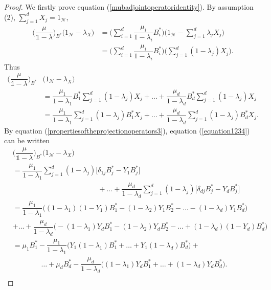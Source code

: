 \documentclass[11pt, reqno]{amsart}
\newcommand\1{\boldsymbol {1}}
\numberwithin{equation}{section}
\begin{document}
\begin{proof}
We firstly prove equation (\ref{mubadjointoperatoridentity}). By assumption  (2), $\sum_{j=1}^{d} X_{j} = 1_{\mathcal{N}}$,
\begin{align*}
\bigg(\dfrac{\mu}{\mathds{1}-\lambda}\bigg)_{B^{*}}\big(1_{\mathcal{N}}-\lambda_{X}\big) &= \bigg(\sum_{i=1}^{d} \dfrac{\mu_{i}}{1-\lambda_{i}} B_{i}^{*} \bigg)\bigg(1_{\mathcal{N}}-\sum_{j=1}^{d}\lambda_{j}X_{j}\bigg) \\
&= \bigg(\sum_{i=1}^{d} \dfrac{\mu_{i}}{1-\lambda_{i}} B_{i}^{*} \bigg)\bigg(\sum_{j=1}^{d}(1-\lambda_{j})X_{j}\bigg).
\end{align*}
Thus
\begin{align}
\bigg(\dfrac{\mu}{\mathds{1}-\lambda}\bigg)_{B^{*}}&\big(1_{\mathcal{N}}-\lambda_{X}\big)\nonumber\\
&= \dfrac{\mu_{1}}{1-\lambda_{1}}B_{1}^{*}\sum_{j=1}^{d}(1-\lambda_{j})X_{j}+\hdots+\dfrac{\mu_{d}}{1-\lambda_{d}}B_{d}^{*}\sum_{j=1}^{d}(1-\lambda_{j})X_{j} \nonumber\\
&= \dfrac{\mu_{1}}{1-\lambda_{1}}\sum_{j=1}^{d}(1-\lambda_{j})B_{1}^{*}X_{j}+\hdots+\dfrac{\mu_{d}}{1-\lambda_{d}}\sum_{j=1}^{d}(1-\lambda_{j})B_{d}^{*}X_{j}.\label{equation1234}  
\end{align}
By equation (\ref{propertiesoftheprojectionoperators3}), equation (\ref{equation1234}) can be written
\begin{align*}
&\bigg(\dfrac{\mu}{\mathds{1}-\lambda}\bigg)_{B^{*}}\big(1_{\mathcal{N}}-\lambda_{X}\big)\\
&= \dfrac{\mu_{1}}{1-\lambda_{1}}\sum_{j=1}^{d}(1-\lambda_{j})\Big[ \delta_{1j}B_{j}^{*}-Y_{1}B_{j}^{*}\Big]\\
&\hspace{5cm}+\hdots+\dfrac{\mu_{d}}{1-\lambda_{d}}\sum_{j=1}^{d}(1-\lambda_{j})\Big[ \delta_{dj}B_{j}^{*}-Y_{d}B_{j}^{*}\Big]\\
& = \dfrac{\mu_{1}}{1-\lambda_{1}}\bigg((1-\lambda_{1})(1-Y_{1})B_{1}^{*}-(1-\lambda_{2})Y_{1}B_{2}^{*}-\hdots-(1-\lambda_{d})Y_{1}B_{d}^{*}\bigg) \\
& +\hdots + \dfrac{\mu_{d}}{1-\lambda_{d}}\bigg(-(1-\lambda_{1})Y_{d}B_{1}^{*}-(1-\lambda_{2})Y_{d}B_{2}^{*}-\hdots+(1-\lambda_{d})(1-Y_{d})B_{d}^{*}\bigg) \\
&=\mu_{1}B_{1}^{*}-\dfrac{\mu_{1}}{1-\lambda_{1}}\bigg(Y_{1}(1-\lambda_{1})B_{1}^{*}+\hdots+Y_{1}(1-\lambda_{d})B_{d}^{*}\bigg)+\\
&~~~~~~~~~~~~~~~~~~\hdots+\mu_{d}B_{d}^{*}-\dfrac{\mu_{d}}{1-\lambda_{d}}\bigg((1-\lambda_{1})Y_{d}B_{1}^{*}+\hdots+(1-\lambda_{d})Y_{d}B_{d}^{*}\bigg). \\ 

\end{align*}
\end{proof}
\end{document}
